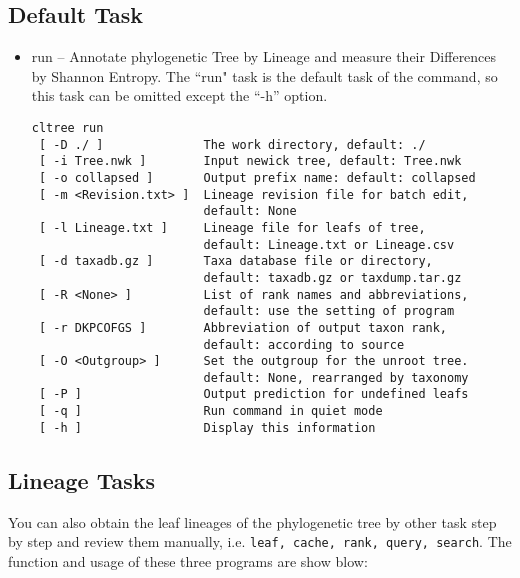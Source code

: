 \documentclass[12pt,a4paper]{article}
\begin{document}
\subsection{Default Task}
\begin{itemize}\itemsep 0pt
\item run -- Annotate phylogenetic Tree by Lineage and measure their Differences by Shannon Entropy. The ``run" task is the default task of the command, so this task can be omitted except the ``-h'' option. 
\begin{verbatim}
cltree run
 [ -D ./ ]              The work directory, default: ./
 [ -i Tree.nwk ]        Input newick tree, default: Tree.nwk
 [ -o collapsed ]       Output prefix name: default: collapsed
 [ -m <Revision.txt> ]  Lineage revision file for batch edit,
                        default: None
 [ -l Lineage.txt ]     Lineage file for leafs of tree,
                        default: Lineage.txt or Lineage.csv
 [ -d taxadb.gz ]       Taxa database file or directory,
                        default: taxadb.gz or taxdump.tar.gz
 [ -R <None> ]          List of rank names and abbreviations,
                        default: use the setting of program
 [ -r DKPCOFGS ]        Abbreviation of output taxon rank,
                        default: according to source
 [ -O <Outgroup> ]      Set the outgroup for the unroot tree.
                        default: None, rearranged by taxonomy
 [ -P ]                 Output prediction for undefined leafs
 [ -q ]                 Run command in quiet mode
 [ -h ]                 Display this information
 \end{verbatim}
\end{itemize}


\subsection{Lineage Tasks}

You can also obtain the leaf lineages of the phylogenetic tree by other task step by step and review them manually, i.e. {\tt leaf, cache, rank, query, search}. The function and usage of these three programs are show blow: 
\end{document}
